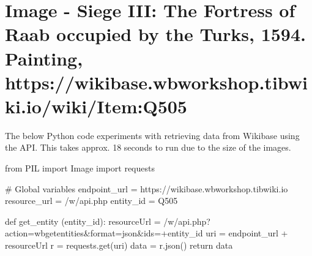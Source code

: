 \documentclass[
  letterpaper,
  DIV=11,
  numbers=noendperiod]{scrreprt}
\newenvironment{Shaded}{\begin{snugshade}}{\end{snugshade}}
\newcommand{\CommentTok}[1]{\textcolor[rgb]{0.37,0.37,0.37}{#1}}
\newcommand{\ControlFlowTok}[1]{\textcolor[rgb]{0.00,0.23,0.31}{#1}}
\newcommand{\ImportTok}[1]{\textcolor[rgb]{0.00,0.46,0.62}{#1}}
\newcommand{\KeywordTok}[1]{\textcolor[rgb]{0.00,0.23,0.31}{#1}}
\newcommand{\NormalTok}[1]{\textcolor[rgb]{0.00,0.23,0.31}{#1}}
\newcommand{\OperatorTok}[1]{\textcolor[rgb]{0.37,0.37,0.37}{#1}}
\newcommand{\StringTok}[1]{\textcolor[rgb]{0.13,0.47,0.30}{#1}}
\begin{document}
\hypertarget{image---siege-iii-the-fortress-of-raab-occupied-by-the-turks-1594.-painting-httpswikibase.wbworkshop.tibwiki.iowikiitemq505}{%
\section{Image - Siege III: The Fortress of Raab occupied by the Turks,
1594. Painting,
https://wikibase.wbworkshop.tibwiki.io/wiki/Item:Q505}\label{image---siege-iii-the-fortress-of-raab-occupied-by-the-turks-1594.-painting-httpswikibase.wbworkshop.tibwiki.iowikiitemq505}}

The below Python code experiments with retrieving data from Wikibase
using the API. This takes approx. 18 seconds to run due to the size of
the images.

\begin{Shaded}
\begin{Highlighting}[]
\ImportTok{from}\NormalTok{ PIL }\ImportTok{import}\NormalTok{ Image}
\ImportTok{import}\NormalTok{ requests}

\CommentTok{\# Global variables}
\NormalTok{endpoint\_url }\OperatorTok{=} \StringTok{\textquotesingle{}https://wikibase.wbworkshop.tibwiki.io\textquotesingle{}}
\NormalTok{resource\_url }\OperatorTok{=} \StringTok{\textquotesingle{}/w/api.php\textquotesingle{}}
\NormalTok{entity\_id }\OperatorTok{=} \StringTok{\textquotesingle{}Q505\textquotesingle{}}

\KeywordTok{def}\NormalTok{ get\_entity (entity\_id):}
\NormalTok{    resourceUrl }\OperatorTok{=} \StringTok{\textquotesingle{}/w/api.php?action=wbgetentities\&format=json\&ids=\textquotesingle{}}\OperatorTok{+}\NormalTok{entity\_id}
\NormalTok{    uri }\OperatorTok{=}\NormalTok{ endpoint\_url }\OperatorTok{+}\NormalTok{ resourceUrl}
\NormalTok{    r }\OperatorTok{=}\NormalTok{ requests.get(uri)}
\NormalTok{    data }\OperatorTok{=}\NormalTok{ r.json()}
    \ControlFlowTok{return}\NormalTok{ data}


\end{Highlighting}
\end{Shaded}
\end{document}
